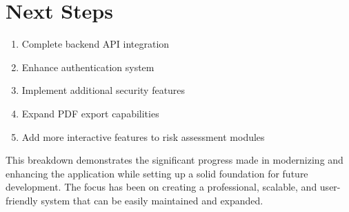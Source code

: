 \documentclass[11pt]{article}
\begin{document}
\section{Next Steps}
\begin{enumerate}[leftmargin=*]
  \item Complete backend API integration
  \item Enhance authentication system
  \item Implement additional security features
  \item Expand PDF export capabilities
  \item Add more interactive features to risk assessment modules
\end{enumerate}

\vspace{1cm}
\noindent
This breakdown demonstrates the significant progress made in modernizing and enhancing the application while setting up a solid foundation for future development. The focus has been on creating a professional, scalable, and user-friendly system that can be easily maintained and expanded.
\end{document}
